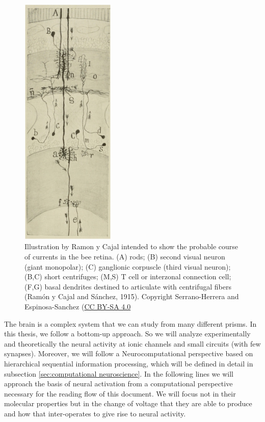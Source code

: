 \begin{figure}[htb!]
    \centering
    \includegraphics[width=0.4\textwidth]{img/intro/cajal-flow.jpg}
    \caption{Illustration by Ramon y Cajal intended to show the probable course of currents in the bee retina. (A) rods; (B) second visual neuron (giant monopolar); (C) ganglionic corpuscle (third visual neuron); (B,C) short centrifuges; (M,S) T cell or interzonal connection cell; (F,G) basal dendrites destined to articulate with centrifugal fibers (Ramón y Cajal and Sánchez, 1915). Copyright Serrano-Herrera and Espinosa-Sanchez \cite{serrano-herrera_domingo_2024} (\href{https://creativecommons.org/licenses/by-sa/4.0/}{CC BY-SA 4.0}}
    \label{cajal-neuron}
\end{figure}


The brain is a complex system that we can study from many different prisms. In this thesis, we follow a bottom-up approach. So we will analyze experimentally and theoretically the neural activity at ionic channels and small circuits (with few synapses). Moreover, we will follow a Neurocomputational perspective based on hierarchical sequential information processing, which will be defined in detail in subsection \ref{sec:computational neuroscience}. In the following lines we will approach the basis of neural activation from a computational perspective necessary for the reading flow of this document. We will focus not in their molecular properties but in the change of voltage that they are able to produce and how that inter-operates to give rise to neural activity. 

